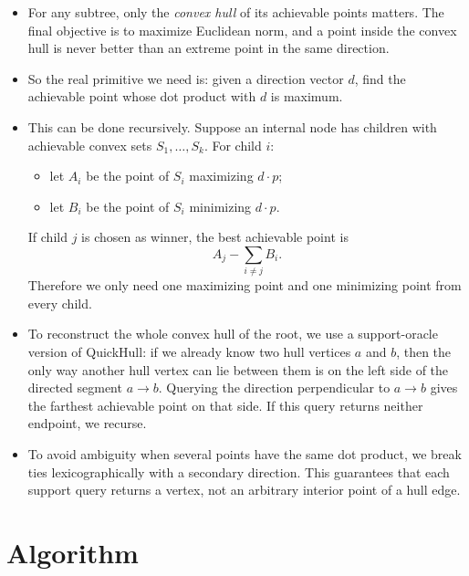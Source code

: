 \documentclass[11pt]{article}
\begin{document}
\begin{itemize}[leftmargin=*]
    \item For any subtree, only the \emph{convex hull} of its achievable points matters. The final objective
    is to maximize Euclidean norm, and a point inside the convex hull is never better than an extreme point
    in the same direction.

    \item So the real primitive we need is:
    given a direction vector $d$, find the achievable point whose dot product with $d$ is maximum.

    \item This can be done recursively. Suppose an internal node has children with achievable convex sets
    $S_1,\dots,S_k$. For child $i$:
    \begin{itemize}[leftmargin=*]
        \item let $A_i$ be the point of $S_i$ maximizing $d \cdot p$;
        \item let $B_i$ be the point of $S_i$ minimizing $d \cdot p$.
    \end{itemize}
    If child $j$ is chosen as winner, the best achievable point is
    \[
        A_j - \sum_{i \ne j} B_i.
    \]
    Therefore we only need one maximizing point and one minimizing point from every child.

    \item To reconstruct the whole convex hull of the root, we use a support-oracle version of QuickHull:
    if we already know two hull vertices $a$ and $b$, then the only way another hull vertex can lie between
    them is on the left side of the directed segment $a \to b$. Querying the direction perpendicular to
    $a \to b$ gives the farthest achievable point on that side. If this query returns neither endpoint, we
    recurse.

    \item To avoid ambiguity when several points have the same dot product, we break ties
    lexicographically with a secondary direction. This guarantees that each support query returns a vertex,
    not an arbitrary interior point of a hull edge.
\end{itemize}

\section*{Algorithm}
\end{document}
